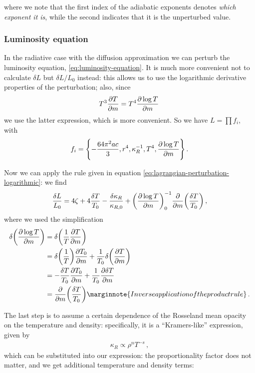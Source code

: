 \documentclass[main.tex]{subfiles}
\begin{document}
%
where we note that the first index of the adiabatic exponents denotes \emph{which exponent it is}, while the second indicates that it is the unperturbed value.


\subsubsection{Luminosity equation}

In the radiative case with the diffusion approximation we can perturb the luminosity equation, \eqref{eq:luminosity-equation}. It is much more convenient not to calculate \(\delta L\) but \(\delta L  / L_0 \) instead: this allows us to use the logarithmic derivative properties of the perturbation; also, since 
%
\begin{align}
T^{3} \pdv{T}{m} = T^{4} \pdv{\log T}{m}
\,
\end{align}
%
we use the latter expression, which is more convenient. 
So we have \(L = \prod f_i\), with 
%
\begin{align}
f_{i} = \qty{- \frac{64 \pi^2 ac}{3}, r^{4}, \kappa_{R}^{-1}, T^{4}, \pdv{\log T}{m}}
\,.
\end{align}

Now we can apply the rule given in equation \eqref{eq:lagrangian-perturbation-logarithmic}: we find
%
\begin{equation}
  \frac{\delta L}{L_0} = 4 \zeta + 4 \frac{\delta T}{T_0} - \frac{\delta \kappa_R}{\kappa_{R,0}} + \qty(\pdv{\log T}{m})^{-1}_{0} \pdv{}{m} \qty( \frac{\delta T}{T_0 })
  \,,
\end{equation}
%
where we used the simplification 
%
\begin{subequations}
\begin{align}
\delta \qty(\pdv{\log T}{m}) &= \delta \qty(\frac{1}{T} \pdv{T}{m})  \\
&= \delta \qty(\frac{1}{T}) \pdv{T_0 }{m} + \frac{1}{T_0 }  \delta \qty(\pdv{T}{m})  \\
&= - \frac{ \delta T}{ T_{0}} \pdv{T_0 }{m} + \frac{1}{T_0 } \pdv{ \delta T }{m }  \\
&= \pdv{}{m} \qty(\frac{ \delta T}{T_0 }) \marginnote{Inverse application of the product rule}
\,.
\end{align}
\end{subequations}

The last step is to assume a certain dependence of the Rosseland mean opacity on the temperature and density: specifically, it is a ``Kramers-like'' expression, given by 
%
\begin{align}
\kappa_{R} \propto \rho^{n} T^{-s}
\,,
\end{align}
%
which can be substituted into our expression: the proportionality factor does not matter, and we get additional temperature and density terms: 
%
%
\end{document}
